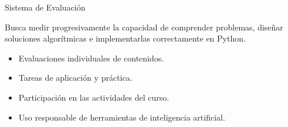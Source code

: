 \documentclass{beamer}
\begin{document}
    \begin{frame}[label=evaluacion]{Sistema de Evaluación}

        Busca medir progresivamente la capacidad de comprender problemas, diseñar soluciones algorítmicas e
        implementarlas correctamente en Python.

        \begin{itemize}
            \item Evaluaciones individuales de contenidos.
            \item Tareas de aplicación y práctica.
            \item Participación en las actividades del curso.
            \item Uso responsable de herramientas de inteligencia artificial.
        \end{itemize}
    \end{frame}
\end{document}
